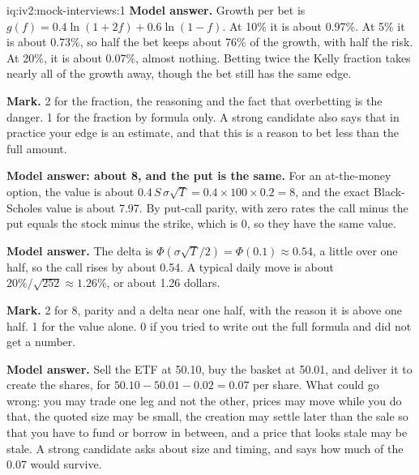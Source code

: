 \begin{solution}{iq:iv2:mock-interviews:1}
\ivstop
\textbf{Model answer.} Growth per bet is $g(f) = 0.4 \ln(1 + 2f) + 0.6 \ln(1 - f)$. At 10\% it is about 0.97\%. At 5\% it is about 0.73\%, so half the bet keeps about 76\% of the growth, with half the risk. At 20\%, it is about 0.07\%, almost nothing. Betting twice the Kelly fraction takes nearly all of the growth away, though the bet still has the same edge.

\textbf{Mark.} 2 for the fraction, the reasoning and the fact that overbetting is the danger. 1 for the fraction by formula only. A strong candidate also says that in practice your edge is an estimate, and that this is a reason to bet less than the full amount.

\ivstop
\textbf{Model answer: about 8, and the put is the same.} For an at-the-money option, the value is about $0.4\, S\, \sigma\sqrt{T} = 0.4 \times 100 \times 0.2 = 8$, and the exact Black-Scholes value is about 7.97. By put-call parity, with zero rates the call minus the put equals the stock minus the strike, which is 0, so they have the same value.

\ivstop
\textbf{Model answer.} The delta is $\Phi(\sigma\sqrt{T}/2) = \Phi(0.1) \approx 0.54$, a little over one half, so the call rises by about 0.54. A typical daily move is about $20\%/\sqrt{252} \approx 1.26\%$, or about 1.26 dollars.

\textbf{Mark.} 2 for 8, parity and a delta near one half, with the reason it is above one half. 1 for the value alone. 0 if you tried to write out the full formula and did not get a number.

\ivstop
\textbf{Model answer.} Sell the ETF at 50.10, buy the basket at 50.01, and deliver it to create the shares, for $50.10 - 50.01 - 0.02 = 0.07$ per share. What could go wrong: you may trade one leg and not the other, prices may move while you do that, the quoted size may be small, the creation may settle later than the sale so that you have to fund or borrow in between, and a price that looks stale may be stale. A strong candidate asks about size and timing, and says how much of the 0.07 would survive.


\end{solution}
